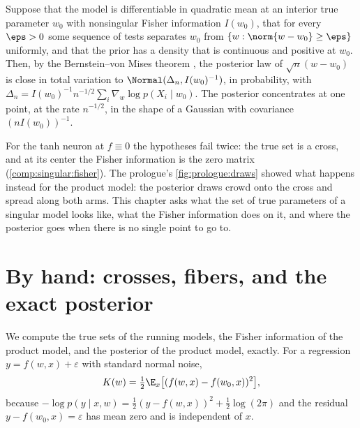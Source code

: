 \begin{refsection}
\begin{regularanswer}
Suppose that the model is differentiable in quadratic mean at an interior true parameter $w_0$ with nonsingular Fisher information $I(w_0)$, that for every $\eps>0$ some sequence of tests separates $w_0$ from $\{w:\norm{w-w_0}\ge\eps\}$ uniformly, and that the prior has a density that is continuous and positive at $w_0$. Then, by the Bernstein--von Mises theorem \parencite[Theorem~10.1]{vanderVaart1998}, the posterior law of $\sqrt n(w-w_0)$ is close in total variation to $\Normal(\Delta_n,I(w_0)^{-1})$, in probability, with $\Delta_n=I(w_0)^{-1}n^{-1/2}\sum_i\nabla_w\log p(X_i\mid w_0)$. The posterior concentrates at one point, at the rate $n^{-1/2}$, in the shape of a Gaussian with covariance $(nI(w_0))^{-1}$.
\end{regularanswer}

For the tanh neuron at $f\equiv0$ the hypotheses fail twice: the true set is a cross, and at its center the Fisher information is the zero matrix (\cref{comp:singular:fisher}). The prologue's \cref{fig:prologue:draws} showed what happens instead for the product model: the posterior draws crowd onto the cross and spread along both arms. This chapter asks what the set of true parameters of a singular model looks like, what the Fisher information does on it, and where the posterior goes when there is no single point to go to.

\section{By hand: crosses, fibers, and the exact posterior}\label{sec:singular:byhand}

We compute the true sets of the running models, the Fisher information of the product model, and the posterior of the product model, exactly. For a regression $y=f(w,x)+\varepsilon$ with standard normal noise,
\begin{equation}\label{eq:singular:Kreg}
K(w)=\tfrac12\E_x\bigl[(f(w,x)-f(w_0,x))^2\bigr],
\end{equation}
because $-\log p(y\mid x,w)=\frac12(y-f(w,x))^2+\frac12\log(2\pi)$ and the residual $y-f(w_0,x)=\varepsilon$ has mean zero and is independent of $x$.


\end{refsection}
